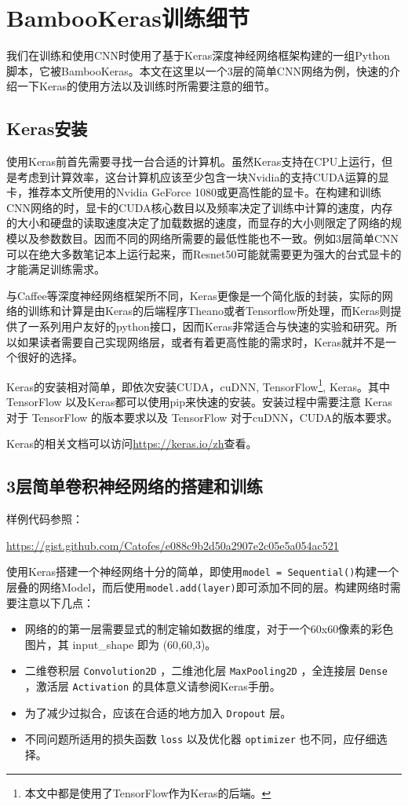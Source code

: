 \chapter{BambooKeras训练细节}
\label{section:train_details}

我们在训练和使用CNN时使用了基于Keras深度神经网络框架构建的一组Python 脚本，它被BambooKeras。本文在这里以一个3层的简单CNN网络为例，快速的介绍一下Keras的使用方法以及训练时所需要注意的细节。

\section{Keras安装}
使用Keras前首先需要寻找一台合适的计算机。虽然Keras支持在CPU上运行，但是考虑到计算效率，这台计算机应该至少包含一块Nvidia的支持CUDA运算的显卡，推荐本文所使用的Nvidia GeForce 1080或更高性能的显卡。在构建和训练CNN网络的时，显卡的CUDA核心数目以及频率决定了训练中计算的速度，内存的大小和硬盘的读取速度决定了加载数据的速度，而显存的大小则限定了网络的规模以及参数数目。因而不同的网络所需要的最低性能也不一致。例如3层简单CNN可以在绝大多数笔记本上运行起来，而Resnet50可能就需要更为强大的台式显卡的才能满足训练需求。

与Caffee等深度神经网络框架所不同，Keras更像是一个简化版的封装，实际的网络的训练和计算是由Keras的后端程序Theano或者Tensorflow所处理，而Keras则提供了一系列用户友好的python接口，因而Keras非常适合与快速的实验和研究。所以如果读者需要自己实现网络层，或者有着更高性能的需求时，Keras就并不是一个很好的选择。

Keras的安装相对简单，即依次安装CUDA，cuDNN, TensorFlow\footnote{本文中都是使用了TensorFlow作为Keras的后端。}, Keras。其中 TensorFlow 以及Keras都可以使用pip来快速的安装。安装过程中需要注意 Keras 对于 TensorFlow 的版本要求以及 TensorFlow 对于cuDNN，CUDA的版本要求。 

Keras的相关文档可以访问\url{https://keras.io/zh}查看。

\section{3层简单卷积神经网络的搭建和训练}

样例代码参照：

\url{https://gist.github.com/Catofes/e088c9b2d50a2907e2c05e5a054ac521}

使用Keras搭建一个神经网络十分的简单，即使用\verb|model = Sequential()|构建一个层叠的网络Model，而后使用\verb|model.add(layer)|即可添加不同的层。构建网络时需要注意以下几点：
\begin{itemize}
    \item 网络的的第一层需要显式的制定输如数据的维度，对于一个60x60像素的彩色图片，其 input\_shape 即为 (60,60,3)。
    \item 二维卷积层 \verb|Convolution2D| ，二维池化层 \verb|MaxPooling2D| ，全连接层 \verb|Dense| ，激活层 \verb|Activation| 的具体意义请参阅Keras手册。
    \item 为了减少过拟合，应该在合适的地方加入 \verb|Dropout| 层。
    \item 不同问题所适用的损失函数 \verb|loss| 以及优化器 \verb|optimizer| 也不同，应仔细选择。
\end{itemize}

